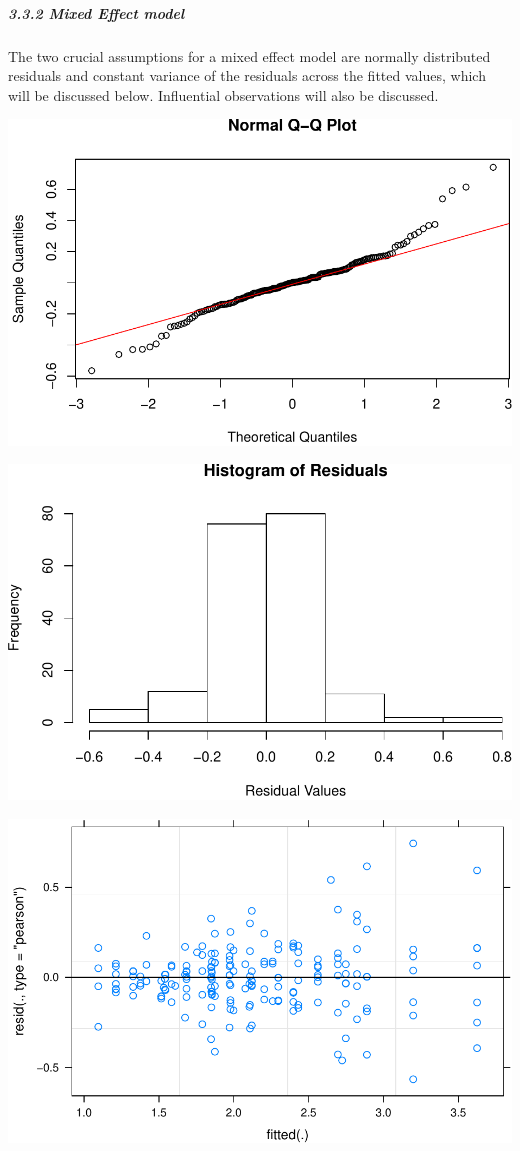 \documentclass[]{article}
\let\oldsubparagraph\subparagraph
\renewcommand{\subparagraph}[1]{\oldsubparagraph{#1}\mbox{}}
\begin{document}
\hypertarget{mixed-effect-model}{%
\subparagraph{3.3.2 Mixed Effect model}\label{mixed-effect-model}}

The two crucial assumptions for a mixed effect model are normally
distributed residuals and constant variance of the residuals across the
fitted values, which will be discussed below. Influential observations
will also be discussed.

\includegraphics{Project3_Rongkui_files/figure-latex/unnamed-chunk-17-1.pdf}

\includegraphics{Project3_Rongkui_files/figure-latex/unnamed-chunk-18-1.pdf}

\includegraphics{Project3_Rongkui_files/figure-latex/unnamed-chunk-19-1.pdf}
\end{document}
